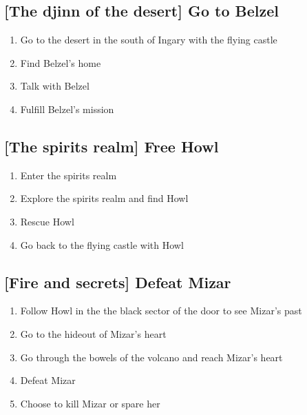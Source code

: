 \subsection{[The djinn of the desert] Go to Belzel}
\begin{enumerate}
\item Go to the desert in the south of Ingary with the flying castle
\item Find Belzel's home
\item Talk with Belzel
\item Fulfill Belzel's mission
\end{enumerate}

\subsection{[The spirits realm] Free Howl}
\begin{enumerate}
\item Enter the spirits realm
\item Explore the spirits realm and find Howl
\item Rescue Howl
\item Go back to the flying castle with Howl
\end{enumerate}

\subsection{[Fire and secrets] Defeat Mizar}
\begin{enumerate}
\item Follow Howl in the the black sector of the door to see Mizar's past
\item Go to the hideout of Mizar's heart
\item Go through the bowels of the volcano and reach Mizar's heart
\item Defeat Mizar
\item Choose to kill Mizar or spare her
\end{enumerate}
